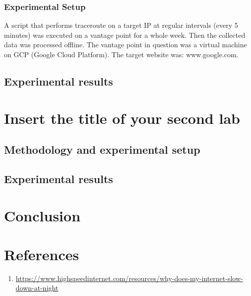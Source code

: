 \documentclass[a4paper,10pt]{article}
\begin{document}
\maketitle
\subsubsection{Experimental Setup}

A script that performs traceroute on a target IP at regular intervals (every 5 minutes) was executed on a vantage point for a whole week. Then the collected data was processed offline. The vantage point in question was a virtual machine on GCP (Google Cloud Platform). The target website was: www.google.com.

\subsection{Experimental results}






\section{Insert the title of your second lab}
\subsection{Methodology and experimental setup}
\subsection{Experimental results}
\section{Conclusion}


\clearpage

\section{References}


\begin{enumerate}

\item \label{article1}  \url{https://www.highspeedinternet.com/resources/why-does-my-internet-slow-down-at-night} 

\end{enumerate}
\end{document}
